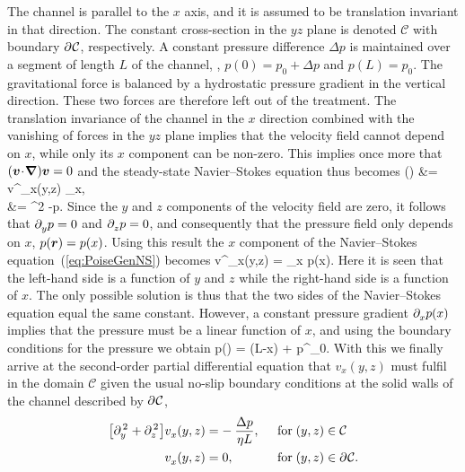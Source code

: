The channel is parallel to the $x$ axis, and it is assumed to be
translation invariant in that direction. The constant
cross-section in the $yz$ plane is denoted $\mathcal{C}$ with
boundary $\partial^{{}}\mathcal{C}$, respectively. A constant pressure
difference $\Delta p$ is maintained over a segment of length $L$
of the channel, \ie, $p(0) = p^{{}}_0+\Delta p$ and $p(L) =
p^{{}}_0$. The gravitational force is balanced by a hydrostatic
pressure gradient in the vertical direction. These two forces are
therefore left out of the treatment. The translation invariance of
the channel in the $x$ direction combined with the vanishing of
forces in the $yz$ plane implies that the velocity field cannot
depend on $x$, while only its $x$ component can be non-zero. This
implies once more that $(\bm{v}\!\cdot\!\boldsymbol{\nabla})\bm{v} = 0$ and the
steady-state Navier--Stokes equation thus becomes
%
 \bsubal
 \vvv(\rrr) &= v^{{}}_x(y,z)\: \een_x,\\
  &=
 \eta \nablabf^2 
 -\nablabf p.
 \esubal
%
Since the $y$ and $z$ components of the velocity field are zero,
it follows that $\partial^{{}}_yp = 0$ and $\partial^{{}}_zp = 0$, and consequently
that the pressure field only depends on $x$, $p(\bm{r}) = p(x)$.
Using this result the $x$ component of the Navier--Stokes
equation~(\ref{eq:PoiseGenNS}) becomes
%
 \eta {} v^{{}}_x(y,z) =
 \pp_x p(x).
 \eeq
%
Here it is seen that the left-hand side is a function of $y$ and
$z$ while the right-hand side is a function of $x$. The only
possible solution is thus that the two sides of the Navier--Stokes
equation equal the same constant. However, a constant pressure
gradient $\partial^{{}}_x p(x)$ implies that the pressure must be a linear
function of $x$, and using the boundary conditions for the
pressure we obtain
%
 p(\rrr) = \: (L-x) + p^{{}}_0.
 \eeq
%
With this we finally arrive at the second-order partial
differential equation that $v^{{}}_x(y,z)$ must fulfil in the
domain $\mathcal{C}$ given the usual no-slip boundary conditions
at the solid walls of the channel described by $\partial^{{}}\mathcal{C}$,
%
 \bsub
 \begin{alignat}{2}
 \eqlab{PoiseGenNSx}
 \big[\ppsqr_y+\ppsqr_z\big] v^{{}}_x(y,z)
 & = - \: \frac{\Delta p}{\eta L},\;\;& &
 \textrm{for} \; (y,z)\in \mathcal{C}\\
 \eqlab{PoiseBC}
 v^{{}}_x(y,z) &= 0, & & \textrm{for} \; (y,z)\in\pp \mathcal{C}.
 \end{alignat}
 \esub
%

